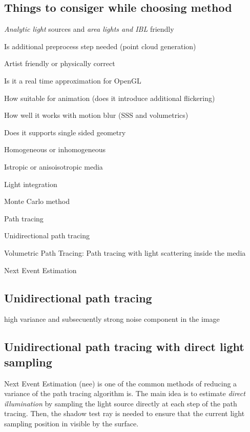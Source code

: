 \subsection{Things to consiger while choosing method}
\begin{description}
  \item [Lighting restrictions] \emph{Analytic light} sources and \emph{area lights and IBL} friendly
  \item [Multiple object friendly]
  \item [Preprocess] Is additional preprocess step needed (point cloud generation)
  \item [Parametrization] Artist friendly or physically correct
  \item [Performance] Is it a real time approximation for OpenGL
  \item [Flickering] How suitable for animation (does it introduce additional flickering)
  \item [Motion blur] How well it works with motion blur (SSS and volumetrics)
  \item [Closed objecs only] Does it supports single sided geometry
  \item Homogeneous or inhomogeneous
  \item Istropic or anisoisotropic media
\end{description}

Light integration

Monte Carlo method

Path tracing

Unidirectional path tracing

Volumetric Path Tracing: Path tracing with light scattering inside the media

Next Event Estimation

\subsection{Unidirectional path tracing}
high variance and subsecuently strong noise component in the image

\subsection{Unidirectional path tracing with direct light sampling}
Next Event Estimation (\gls{nee}) is one of the common methods of reducing a
variance of the path tracing algorithm is. The main idea is to estimate
\textit{direct illumination} by sampling the light source directly at each step
of the path tracing. Then, the shadow test ray is needed to ensure that the
current light sampling position in visible by the surface.

